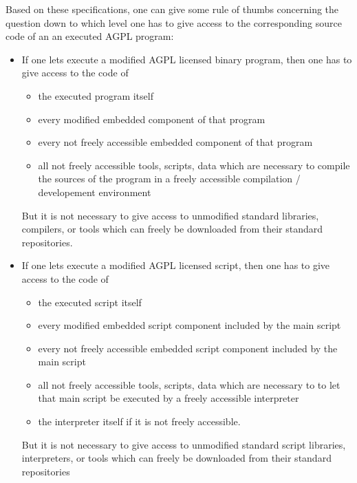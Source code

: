 Based on these specifications, one can give some rule of thumbs concerning the
question down to which level one has to give access to the corresponding source
code of an an executed AGPL program:
\begin{itemize}
  \item If one lets execute a modified AGPL licensed binary program, then one has
  to give access to the code of
  \begin{itemize}
  \item the executed program itself
  \item every modified embedded component of that program
  \item every not freely accessible embedded component of that program
  \item all not freely accessible tools, scripts, data which are necessary to
  compile the sources of the program in a freely accessible compilation /
  developement environment
  \end{itemize}
  But it is not necessary to give access to unmodified standard libraries,
  compilers, or tools which can freely be downloaded from their standard
  repositories.
  \item If one lets execute a modified AGPL licensed script, then one has
  to give access to the code of
  \begin{itemize}
  \item the executed script itself
  \item every modified embedded script component included by the main script
  \item every not freely accessible embedded script component included by the main script
  \item all not freely accessible tools, scripts, data which are necessary to
  to let that main script be executed by a freely accessible interpreter
  \item the interpreter itself if it is not freely accessible.
  \end{itemize}
  But it is not necessary to give access to unmodified standard script
  libraries, interpreters, or tools which can freely be downloaded from their
  standard repositories
  
\end{itemize}



